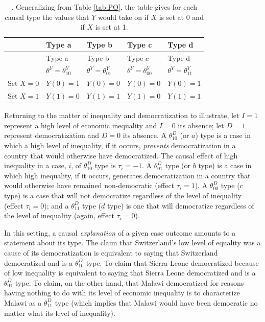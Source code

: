 \documentclass[
  12pt,
]{book}
\begin{document}
\begin{longtable}[]{@{}
  >{\raggedright\arraybackslash}p{}
  >{\centering\arraybackslash}p{}
  >{\centering\arraybackslash}p{}
  >{\centering\arraybackslash}p{}
  >{\centering\arraybackslash}p{}@{}}
\caption{\label{tab:POGEN}. Generalizing from Table \ref{tab:PO}, the table gives for each causal type the values that \(Y\) would take on if \(X\) is set at \(0\) and if \(X\) is set at 1.}\tabularnewline
\toprule
\small & Type a & Type b & Type c & Type d \\
\midrule
\endfirsthead
\toprule
\small & Type a & Type b & Type c & Type d \\
\midrule
\endhead
& \(\theta^Y=\theta^Y_{10}\) & \(\theta^Y=\theta^Y_{01}\) & \(\theta^Y=\theta^Y_{00}\) & \(\theta^Y=\theta^Y_{11}\) \\
Set \(X=0\) & \(Y(0)=1\) & \(Y(0)=0\) & \(Y(0)=0\) & \(Y(0)=1\) \\
Set \(X=1\) & \(Y(1)=0\) & \(Y(1)=1\) & \(Y(1)=0\) & \(Y(1)=1\) \\
\bottomrule
\end{longtable}

Returning to the matter of inequality and democratization to illustrate, let \(I=1\) represent a high level of economic inequality and \(I=0\) its absence; let \(D=1\) represent democratization and \(D=0\) its absence. A \(\theta^D_{10}\) (or \(a\)) type is a case in which a high level of inequality, if it occurs, \emph{prevents} democratization in a country that would otherwise have democratized. The causal effect of high inequality in a case, \(i\), of \(\theta^D_{10}\) type is \(\tau_i= -1\). A \(\theta^D_{01}\) type (or \(b\) type) is a case in which high inequality, if it occurs, generates democratization in a country that would otherwise have remained non-democratic (effect \(\tau_i= 1\)). A \(\theta^D_{00}\) type (\(c\) type) is a case that will not democratize regardless of the level of inequality (effect \(\tau_i = 0\)); and a \(\theta^D_{11}\) type (\(d\) type) is one that will democratize regardless of the level of inequality (again, effect \(\tau_i= 0\)).

In this setting, a causal \emph{explanation} of a given case outcome amounts to a statement about its type. The claim that Switzerland's low level of equality was a cause of its democratization is equivalent to saying that Switzerland democratized and is a \(\theta^D_{10}\) type. To claim that Sierra Leone democratized because of low inequality is equivalent to saying that Sierra Leone democratized and is a \(\theta^D_{01}\) type. To claim, on the other hand, that Malawi democratized for reasons having nothing to do with its level of economic inequality is to characterize Malawi as a \(\theta^D_{11}\) type (which implies that Malawi would have been democratic no matter what its level of inequality).
\end{document}
